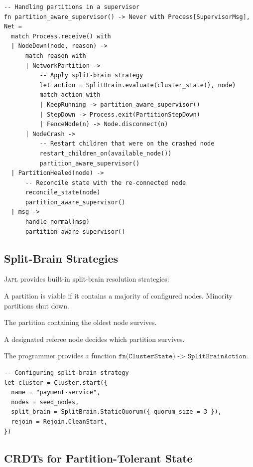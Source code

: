 \documentclass[11pt,a4paper]{article}
\newcommand{\japl}{\textsc{Japl}}
\begin{document}
\begin{lstlisting}
-- Handling partitions in a supervisor
fn partition_aware_supervisor() -> Never with Process[SupervisorMsg], Net =
  match Process.receive() with
  | NodeDown(node, reason) ->
      match reason with
      | NetworkPartition ->
          -- Apply split-brain strategy
          let action = SplitBrain.evaluate(cluster_state(), node)
          match action with
          | KeepRunning -> partition_aware_supervisor()
          | StepDown -> Process.exit(PartitionStepDown)
          | FenceNode(n) -> Node.disconnect(n)
      | NodeCrash ->
          -- Restart children that were on the crashed node
          restart_children_on(available_node())
          partition_aware_supervisor()
  | PartitionHealed(node) ->
      -- Reconcile state with the re-connected node
      reconcile_state(node)
      partition_aware_supervisor()
  | msg ->
      handle_normal(msg)
      partition_aware_supervisor()
\end{lstlisting}

\subsection{Split-Brain Strategies}

\japl{} provides built-in split-brain resolution strategies:

\begin{description}[nosep]
  \item[Static quorum:] A partition is viable if it contains a majority
    of configured nodes. Minority partitions shut down.
  \item[Keep oldest:] The partition containing the oldest node survives.
  \item[Keep referee:] A designated referee node decides which partition
    survives.
  \item[Custom:] The programmer provides a function
    $\texttt{fn(ClusterState) -> SplitBrainAction}$.
\end{description}

\begin{lstlisting}
-- Configuring split-brain strategy
let cluster = Cluster.start({
  name = "payment-service",
  nodes = seed_nodes,
  split_brain = SplitBrain.StaticQuorum({ quorum_size = 3 }),
  rejoin = Rejoin.CleanStart,
})
\end{lstlisting}

\subsection{CRDTs for Partition-Tolerant State}
\end{document}
